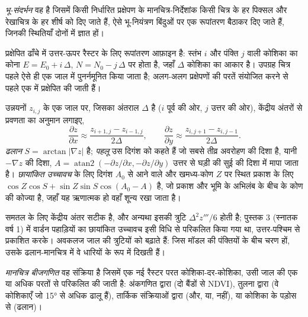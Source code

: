 \begin{definition}[भू-संदर्भन]\label{def:b3:remote-sensing-gis:georef}
\emph{भू-संदर्भन} वह है जिसमें किसी निर्धारित प्रक्षेपण के मानचित्र-निर्देशांक
किसी चित्र के हर पिक्सल और रेखाचित्र के हर शीर्ष को दिए जाते हैं,
ऐसे भू-नियंत्रण बिंदुओं पर एक रूपांतरण बैठाकर दिए जाते हैं,
जिनकी स्थितियाँ दोनों में ज्ञात हों।
\end{definition}

प्रक्षेपित ढाँचे में उत्तर-ऊपर रैस्टर के लिए रूपांतरण आफ़ाइन है:
स्तंभ $i$ और पंक्ति $j$ वाली कोशिका का कोना $E = E_0 + i\,\Delta$,
$N = N_0 - j\,\Delta$ पर होता है, जहाँ $\Delta$ कोशिका का आकार है। उपग्रह चित्र
पहले ऐसे ही एक जाल में पुनर्नमूनित किया जाता है; अलग-अलग प्रक्षेपणों की परतें
संयोजित करने से पहले एक में प्रक्षेपित की जाती हैं।

\begin{method}\label{met:b3:remote-sensing-gis:slope}
उन्नयनों $z_{i,j}$ के एक जाल पर, जिसका अंतराल $\Delta$ है ($i$ पूर्व की ओर, $j$
उत्तर की ओर), केंद्रीय अंतरों से प्रवणता का अनुमान लगाइए,
\[
\frac{\partial z}{\partial x} \approx \frac{z_{i+1,j} - z_{i-1,j}}{2\Delta} ,
\qquad
\frac{\partial z}{\partial y} \approx \frac{z_{i,j+1} - z_{i,j-1}}{2\Delta} .
\]
\emph{ढलान} $S = \arctan|\nabla z|$ है; \emph{पहलू} उस दिगंश को कहते हैं
जो सबसे तीव्र अवरोहण की दिशा है, यानी $-\nabla z$ की दिशा, $A =
\operatorname{atan2}(-\partial z/\partial x, -\partial z/\partial y)$
उत्तर से घड़ी की सुई की दिशा में मापा जाता है। \emph{छायांकित उच्चावच} के लिए
दिगंश $A_0$ से आने वाले और खमध्य-कोण $Z$ पर स्थित प्रकाश के लिए $\cos Z\cos S + \sin Z\sin S
\cos(A_0 - A)$ है, जो प्रकाश और भूमि के अभिलंब के बीच के कोण की कोज्या है,
जहाँ यह ऋणात्मक हो वहाँ शून्य रखा जाता है।
\end{method}

समतल के लिए केंद्रीय अंतर सटीक है, और अन्यथा इसकी त्रुटि
$\Delta^2 z'''/6$ होती है; पुस्तक 3 (स्नातक वर्ष 1) में वार्डन पहाड़ियों का
छायांकित उच्चावच इसी विधि से परिकलित किया गया था, उत्तर-पश्चिम से प्रकाशित करके।
अवकलज जाल की त्रुटियों को बढ़ाते हैं: जिस मॉडल की पंक्तियों के बीच चरण हों,
उसके ढलान-मानचित्र में वे धारियों के रूप में दिखती हैं।

\begin{definition}[मानचित्र बीजगणित]\label{def:b3:remote-sensing-gis:map-algebra}
\emph{मानचित्र बीजगणित} वह संक्रिया है जिसमें एक नई रैस्टर परत
कोशिका-दर-कोशिका, उसी जाल की एक या अधिक परतों से परिकलित की जाती है:
अंकगणित द्वारा (दो बैंडों से NDVI), तुलना द्वारा (वे कोशिकाएँ जो
\ang{15} से अधिक ढालू हैं), तार्किक संक्रियाओं द्वारा (और, या, नहीं), या
कोशिका के पड़ोस से (ढलान)।
\end{definition}

